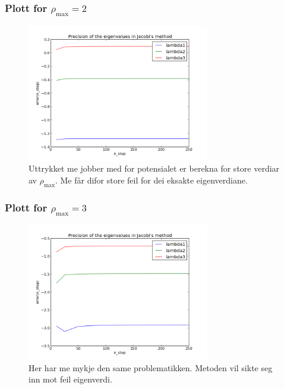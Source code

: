 \documentclass[11pt, a4paper]{article}
\begin{document}
    \subsubsection{Plott for $\rho_{\text{max}} = 2$}
      \begin{figure}[H]
        \centering
        \includegraphics[width=300px]{feil2.png}
        \caption{Uttrykket me jobber med for potensialet er berekna for store verdiar av $\rho_{\text{max}}$. Me får difor store feil for dei eksakte eigenverdiane.}
      \end{figure}

    \subsubsection{Plott for $\rho_{\text{max}} = 3$}
      \begin{figure}[H]
        \centering
        \includegraphics[width=300px]{feil3.png}
        \caption{Her har me mykje den same problematikken. Metoden vil sikte seg inn mot feil eigenverdi.}
      \end{figure}
\end{document}
